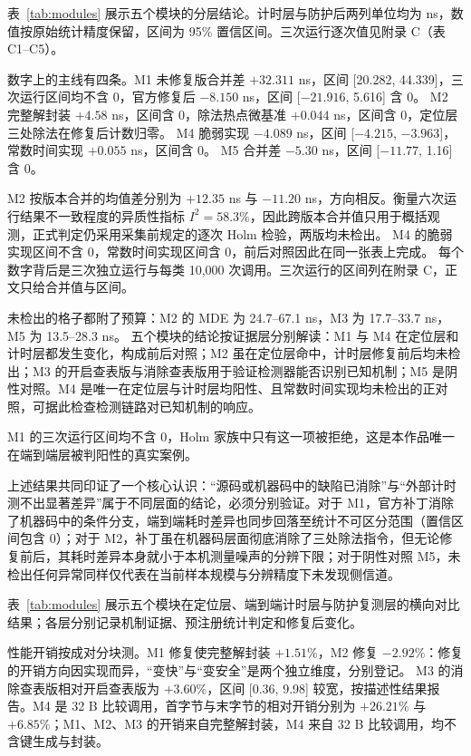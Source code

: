 表~\ref{tab:modules} 展示五个模块的分层结论。计时层与防护后两列单位均为 ns，数值按原始统计精度保留，区间为 95\% 置信区间。三次运行逐次值见附录 C（表 C1--C5）。

数字上的主线有四条。M1 未修复版合并差 $+32.311$ ns，区间 [20.282, 44.339]，三次运行区间均不含 0，官方修复后 $-8.150$ ns，区间 [$-21.916$, 5.616] 含 0。%
M2 完整解封装 $+4.58$ ns，区间含 0，除法热点微基准 $+0.044$ ns，区间含 0，定位层三处除法在修复后计数归零。%
M4 脆弱实现 $-4.089$ ns，区间 [$-4.215$, $-3.963$]，常数时间实现 $+0.055$ ns，区间含 0。%
M5 合并差 $-5.30$ ns，区间 [$-11.77$, 1.16] 含 0。%

M2 按版本合并的均值差分别为 $+12.35$ ns 与 $-11.20$ ns，方向相反。衡量六次运行结果不一致程度的异质性指标 $I^2=58.3\%$，因此跨版本合并值只用于概括观测，正式判定仍采用采集前规定的逐次 Holm 检验，两版均未检出。%
M4 的脆弱实现区间不含 0，常数时间实现区间含 0，前后对照因此在同一张表上完成。%
每个数字背后是三次独立运行与每类 10,000 次调用。三次运行的区间列在附录 C，正文只给合并值与区间。

未检出的格子都附了预算：M2 的 MDE 为 24.7--67.1 ns，M3 为 17.7--33.7 ns，M5 为 13.5--28.3 ns。%
五个模块的结论按证据层分别解读：M1 与 M4 在定位层和计时层都发生变化，构成前后对照；M2 虽在定位层命中，计时层修复前后均未检出；M3 的开启查表版与消除查表版用于验证检测器能否识别已知机制；M5 是阴性对照。M4 是唯一在定位层与计时层均阳性、且常数时间实现均未检出的正对照，可据此检查检测链路对已知机制的响应。

M1 的三次运行区间均不含 0，Holm 家族中只有这一项被拒绝，这是本作品唯一在端到端层被判阳性的真实案例。%

上述结果共同印证了一个核心认识：“源码或机器码中的缺陷已消除”与“外部计时测不出显著差异”属于不同层面的结论，必须分别验证。对于 M1，官方补丁消除了机器码中的条件分支，端到端耗时差异也同步回落至统计不可区分范围（置信区间包含 0）；对于 M2，补丁虽在机器码层面彻底消除了三处除法指令，但无论修复前后，其耗时差异本身就小于本机测量噪声的分辨下限；对于阴性对照 M5，未检出任何异常同样仅代表在当前样本规模与分辨精度下未发现侧信道。

表~\ref{tab:modules} 展示五个模块在定位层、端到端计时层与防护复测层的横向对比结果；各层分别记录机制证据、预注册统计判定和修复后变化。

性能开销按成对分块测。M1 修复使完整解封装 $+1.51\%$，M2 修复 $-2.92\%$：修复的开销方向因实现而异，“变快”与“变安全”是两个独立维度，分别登记。%
M3 的消除查表版相对开启查表版为 $+3.60\%$，区间 [0.36, 9.98] 较宽，按描述性结果报告。M4 是 32 B 比较调用，首字节与末字节的相对开销分别为 $+26.21\%$ 与 $+6.85\%$；M1、M2、M3 的开销来自完整解封装，M4 来自 32 B 比较调用，均不含键生成与封装。

